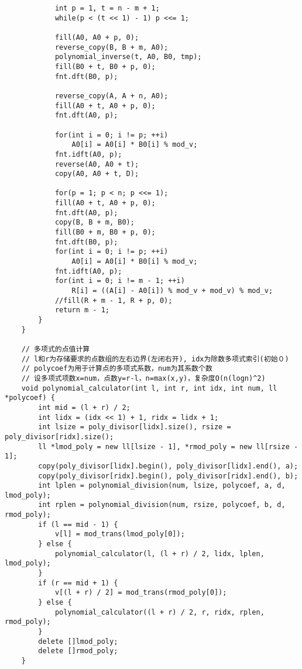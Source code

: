\begin{verbatim}
            int p = 1, t = n - m + 1;
            while(p < (t << 1) - 1) p <<= 1;
    
            fill(A0, A0 + p, 0);
            reverse_copy(B, B + m, A0);
            polynomial_inverse(t, A0, B0, tmp);
            fill(B0 + t, B0 + p, 0);
            fnt.dft(B0, p);
    
            reverse_copy(A, A + n, A0);
            fill(A0 + t, A0 + p, 0);
            fnt.dft(A0, p);
    
            for(int i = 0; i != p; ++i)
                A0[i] = A0[i] * B0[i] % mod_v;
            fnt.idft(A0, p);
            reverse(A0, A0 + t);
            copy(A0, A0 + t, D);
    
            for(p = 1; p < n; p <<= 1);
            fill(A0 + t, A0 + p, 0);
            fnt.dft(A0, p);
            copy(B, B + m, B0);
            fill(B0 + m, B0 + p, 0);
            fnt.dft(B0, p);
            for(int i = 0; i != p; ++i)
                A0[i] = A0[i] * B0[i] % mod_v;
            fnt.idft(A0, p);
            for(int i = 0; i != m - 1; ++i)
                R[i] = ((A[i] - A0[i]) % mod_v + mod_v) % mod_v;
            //fill(R + m - 1, R + p, 0);
            return m - 1;
        }
    }
    
    // 多项式的点值计算
    // l和r为存储要求的点数组的左右边界(左闭右开), idx为除数多项式索引(初始０)
    // polycoef为用于计算点的多项式系数，num为其系数个数
    // 设多项式项数x=num，点数y=r-l，n=max(x,y)，复杂度O(n(logn)^2)
    void polynomial_calculator(int l, int r, int idx, int num, ll *polycoef) {
        int mid = (l + r) / 2;
        int lidx = (idx << 1) + 1, ridx = lidx + 1;
        int lsize = poly_divisor[lidx].size(), rsize = poly_divisor[ridx].size();
        ll *lmod_poly = new ll[lsize - 1], *rmod_poly = new ll[rsize - 1];
        copy(poly_divisor[lidx].begin(), poly_divisor[lidx].end(), a);
        copy(poly_divisor[ridx].begin(), poly_divisor[ridx].end(), b);
        int lplen = polynomial_division(num, lsize, polycoef, a, d, lmod_poly);
        int rplen = polynomial_division(num, rsize, polycoef, b, d, rmod_poly);
        if (l == mid - 1) {
            v[l] = mod_trans(lmod_poly[0]);
        } else {
            polynomial_calculator(l, (l + r) / 2, lidx, lplen, lmod_poly);
        }
        if (r == mid + 1) {
            v[(l + r) / 2] = mod_trans(rmod_poly[0]);
        } else {
            polynomial_calculator((l + r) / 2, r, ridx, rplen, rmod_poly);
        }
        delete []lmod_poly;
        delete []rmod_poly;
    }
    

\end{verbatim}

